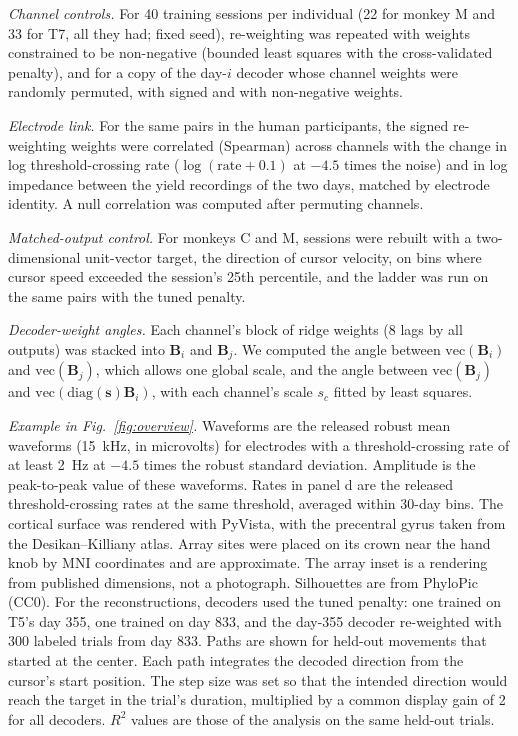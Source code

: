 \documentclass[pdflatex,sn-nature]{sn-jnl}
\begin{document}
\textit{Channel controls.} For 40 training sessions per individual (22 for monkey M and 33 for T7, all they had; fixed
seed), re-weighting was repeated with weights
constrained to be non-negative (bounded least squares with the cross-validated penalty), and for a copy of the day-$i$
decoder whose channel weights were randomly permuted, with signed and with non-negative weights.

\textit{Electrode link.} For the same pairs in the human participants, the signed re-weighting weights were correlated
(Spearman) across channels with the change in log threshold-crossing rate ($\log(\text{rate} + 0.1)$ at $-4.5$ times the
noise) and in log impedance between the yield recordings of the two days, matched by electrode identity. A null
correlation was computed after permuting channels.

\textit{Matched-output control.} For monkeys C and M, sessions were rebuilt with a two-dimensional unit-vector target,
the direction of cursor velocity, on bins where cursor speed exceeded the session's 25th percentile, and the ladder was run on
the same pairs with the tuned penalty.

\textit{Decoder-weight angles.} Each channel's block of ridge weights (8 lags by all outputs) was stacked into
$\mathbf{B}_i$ and $\mathbf{B}_j$. We computed the angle between $\mathrm{vec}(\mathbf{B}_i)$ and $\mathrm{vec}(\mathbf{B}_j)$,
which allows one global scale, and the angle between $\mathrm{vec}(\mathbf{B}_j)$ and $\mathrm{vec}(\mathrm{diag}(\mathbf{s})
\mathbf{B}_i)$, with each channel's scale $s_c$ fitted by least squares.

\textit{Example in Fig.~\ref{fig:overview}.} Waveforms are the released robust mean waveforms (15~kHz, in microvolts)
for electrodes with a threshold-crossing rate of at least 2~Hz at $-4.5$ times the robust standard deviation. Amplitude is the
peak-to-peak value of these waveforms. Rates in panel d are the released threshold-crossing rates at the same
threshold, averaged within 30-day bins. The cortical surface was rendered with PyVista, with the precentral gyrus taken from the Desikan--Killiany
atlas. Array sites were placed on its crown near the hand knob by MNI coordinates and are approximate. The array
inset is a rendering from published dimensions, not a photograph. Silhouettes are from PhyloPic (CC0). For the
reconstructions, decoders used the tuned penalty: one trained on T5's day 355, one trained on day 833, and the day-355
decoder re-weighted with 300 labeled trials from day 833. Paths are shown for held-out movements that started at the
center. Each path integrates the decoded direction from the cursor's start position. The step size was set so that
the intended direction would reach the target in the trial's duration, multiplied by a common display gain of 2 for
all decoders. $R^2$ values are those of the analysis on the same held-out trials.
\end{document}
